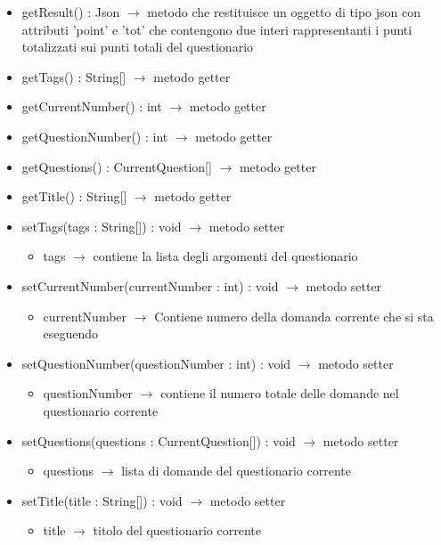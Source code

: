 \begin{description}
\begin{itemize}
	\item getResult() : Json $\rightarrow$ metodo che restituisce un oggetto di tipo json con attributi 'point' e 'tot' che contengono due interi rappresentanti i punti totalizzati sui punti totali del questionario
	\item getTags() : String[] $\rightarrow$ metodo getter
	\item getCurrentNumber() : int $\rightarrow$ metodo getter
	\item getQuestionNumber() : int $\rightarrow$ metodo getter
	\item getQuestions() : CurrentQuestion[] $\rightarrow$ metodo getter
	\item getTitle() : String[] $\rightarrow$ metodo getter
	\item setTags(tags : String[]) : void $\rightarrow$ metodo setter\begin{itemize}
		\item tags $\rightarrow$ contiene la lista degli argomenti del questionario
	\end{itemize}
	
	\item setCurrentNumber(currentNumber : int) : void $\rightarrow$ metodo setter\begin{itemize}
		\item currentNumber $\rightarrow$  Contiene numero della domanda corrente che si sta eseguendo
	\end{itemize}
	
	\item setQuestionNumber(questionNumber : int) : void $\rightarrow$ metodo setter\begin{itemize}
		\item questionNumber $\rightarrow$ contiene il numero totale delle domande nel questionario corrente
	\end{itemize}
	
	\item setQuestions(questions : CurrentQuestion[]) : void $\rightarrow$ metodo setter\begin{itemize}
		\item questions $\rightarrow$ lista di domande del questionario corrente
	\end{itemize}
	
	\item setTitle(title : String[]) : void $\rightarrow$ metodo setter\begin{itemize}
		\item title $\rightarrow$ titolo del questionario corrente
	\end{itemize}
	
\end{itemize}

\end{description}

